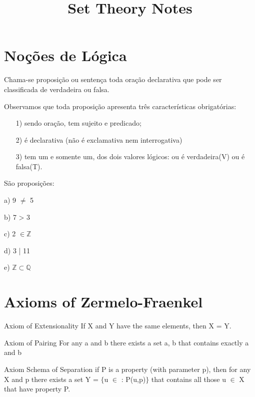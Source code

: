 \documentclass[10pt,a4paper]{article}
\title{Set Theory Notes}
\begin{document}
\maketitle
\tableofcontents
\newpage

\section{Noções de Lógica}
\begin{df}
	Chama-se proposição ou sentença toda oração declarativa que pode ser classificada de verdadeira ou falsa.
\end{df}

Observamos que toda proposição apresenta três características obrigatórias:

\begin{itemize}
	\item[1)] sendo oração, tem sujeito e predicado;
	\item[2)] é declarativa (não é exclamativa nem interrogativa)
	\item[3)] tem um e somente um, dos dois valores lógicos: ou é verdadeira(V) ou é falsa(T).
\end{itemize}

\begin{eg}
	São proposições:
	
	\item[a)] 9 $\neq$ 5
	\item[b)] 7 > 3
	\item[c)] 2 $\in \mathbb{Z}$
	\item[d)] 3 | 11
	\item[e)] $\mathbb{Z} \subset \mathbb{Q}$ 
\end{eg}

\section{Axioms  of Zermelo-Fraenkel}
\begin{axiom}{Axiom of Extensionality}
	If X and Y have the same elements, then X = Y.
\end{axiom}

\begin{axiom}{Axiom of Pairing}
	For any a and b there exists a set {a, b} that contains exactly a and b
\end{axiom}

\begin{axiom}{Axiom Schema of Separation}
	if P is a property (with parameter p), then for any X and p there exists a set Y = $\lbrace$u $\in$ : P(u,p)$\rbrace$ that contains all those u $\in$ X that have property P.
\end{axiom}
\end{document}
